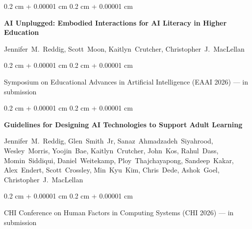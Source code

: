 \documentclass[10pt, letterpaper]{article}
\newenvironment{onecolentry}{
    \begin{adjustwidth}{
        0.2 cm + 0.00001 cm
    }{
        0.2 cm + 0.00001 cm
    }
}{
    \end{adjustwidth}
} %
\begin{document}
        \begin{samepage}
            \begin{onecolentry}
                \textbf{AI Unplugged: Embodied Interactions for AI Literacy in Higher Education}

                \vspace{0.10 cm}

                \mbox{Jennifer M. Reddig}, \mbox{Scott Moon}, \mbox{Kaitlyn Crutcher}, \mbox{Christopher J. MacLellan}
            \end{onecolentry}


            \vspace{0.10 cm}

            \begin{onecolentry}
        Symposium on Educational Advances in Artificial Intelligence (EAAI 2026) — in submission    \end{onecolentry}
        \end{samepage}

        \vspace{0.2 cm}

        \begin{samepage}
            \begin{onecolentry}
                \textbf{Guidelines for Designing AI Technologies to Support Adult Learning}

                \vspace{0.10 cm}

                \mbox{Jennifer M. Reddig}, \mbox{Glen Smith Jr}, \mbox{Sanaz Ahmadzadeh Siyahrood}, \mbox{Wesley Morris}, \mbox{Yoojin Bae}, \mbox{Kaitlyn Crutcher}, \mbox{John Kos}, \mbox{Rahul Dass}, \mbox{Momin Siddiqui}, \mbox{Daniel Weitekamp}, \mbox{Ploy Thajchayapong}, \mbox{Sandeep Kakar}, \mbox{Alex Endert}, \mbox{Scott Crossley}, \mbox{Min Kyu Kim}, \mbox{Chris Dede}, \mbox{Ashok Goel}, \mbox{Christopher J. MacLellan}
            \end{onecolentry}


            \vspace{0.10 cm}

            \begin{onecolentry}
        CHI Conference on Human Factors in Computing Systems (CHI 2026) — in submission    \end{onecolentry}
        \end{samepage}


    
\end{document}
